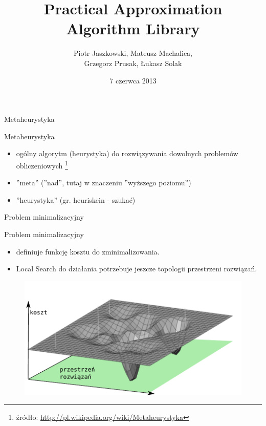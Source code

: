 \documentclass[blue]{beamer}
\title{Practical Approximation Algorithm Library}
\author{Piotr Jaszkowski, Mateusz Machalica,\\ Grzegorz Prusak, Łukasz Solak}
\date{7 czerwca 2013}
\begin{document}

\begin{frame}
\titlepage
\end{frame}

\begin{frame}{Metaheurystyka}
\begin{block}{Metaheurystyka}
\begin{itemize}
\item ogólny algorytm (heurystyka) do rozwiązywania dowolnych problemów obliczeniowych
	\footnote{źródło: \url{http://pl.wikipedia.org/wiki/Metaheurystyka}}
\item ''meta'' (''nad'', tutaj w znaczeniu ''wyższego poziomu'')
\item ''heurystyka'' (gr. heuriskein - szukać)
\end{itemize}
\end{block}
\end{frame}

\begin{frame}{Problem minimalizacyjny}
\begin{block}{Problem minimalizacyjny}
\begin{itemize}
\item definiuje funkcję kosztu do zminimalizowania.
\item Local Search do działania potrzebuje jeszcze topologii przestrzeni rozwiązań.
\end{itemize}
\end{block}
\begin{figure}
\includegraphics[scale=.7]{ss1.pdf}
\end{figure}
\end{frame}
\end{document}
